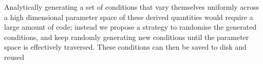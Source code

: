 \documentclass[a4paper, 10pt]{article}
\begin{document}
Analytically generating a set of conditions that vary themselves uniformly across a high dimensional parameter space of these derived quantities would require a large amount of code; instead we propose a strategy to randomise the generated conditions, and keep randomly generating new conditions until the parameter space is effectively traversed. These conditions can then be saved to disk and reused



\end{document}
